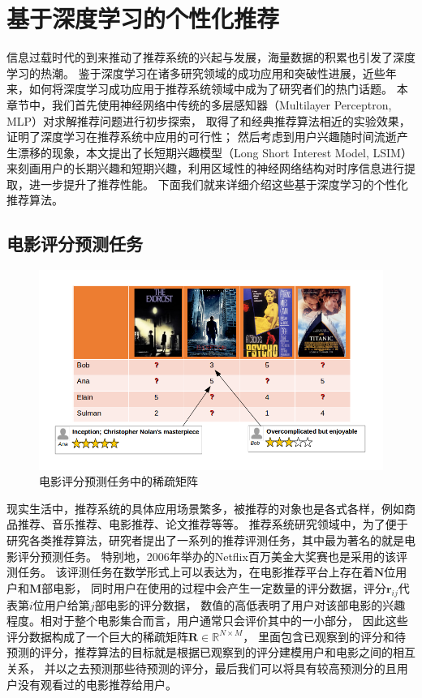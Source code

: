 \chapter{基于深度学习的个性化推荐}
信息过载时代的到来推动了推荐系统的兴起与发展，海量数据的积累也引发了深度学习的热潮。
鉴于深度学习在诸多研究领域的成功应用和突破性进展，近些年来，如何将深度学习成功应用于推荐系统领域中成为了研究者们的热门话题。
本章节中，我们首先使用神经网络中传统的多层感知器（Multilayer Perceptron, MLP）对求解推荐问题进行初步探索，
取得了和经典推荐算法相近的实验效果，证明了深度学习在推荐系统中应用的可行性；
然后考虑到用户兴趣随时间流逝产生漂移的现象，本文提出了长短期兴趣模型（Long Short Interest Model, LSIM）
来刻画用户的长期兴趣和短期兴趣，利用区域性的神经网络结构对时序信息进行提取，进一步提升了推荐性能。
下面我们就来详细介绍这些基于深度学习的个性化推荐算法。

\section{电影评分预测任务}
\begin{figure}[htbp]
\centering
\includegraphics[scale=0.6]{images/task1.png}
\caption{电影评分预测任务中的稀疏矩阵}
\label{fig:task1}
\end{figure}

现实生活中，推荐系统的具体应用场景繁多，被推荐的对象也是各式各样，例如商品推荐、音乐推荐、电影推荐、论文推荐等等。
推荐系统研究领域中，为了便于研究各类推荐算法，研究者提出了一系列的推荐评测任务，其中最为著名的就是电影评分预测任务。
特别地，2006年举办的Netflix百万美金大奖赛也是采用的该评测任务。
该评测任务在数学形式上可以表达为，在电影推荐平台上存在着$\mathbf{N}$位用户和$\mathbf{M}$部电影，
同时用户在使用的过程中会产生一定数量的评分数据，评分$\mathbf{r}_{ij}$代表第$i$位用户给第$j$部电影的评分数据，
数值的高低表明了用户对该部电影的兴趣程度。相对于整个电影集合而言，用户通常只会评价其中的一小部分，
因此这些评分数据构成了一个巨大的稀疏矩阵$\mathbf{R} \in \mathbb{R}^{N \times M}$，
里面包含已观察到的评分和待预测的评分，推荐算法的目标就是根据已观察到的评分建模用户和电影之间的相互关系，
并以之去预测那些待预测的评分，最后我们可以将具有较高预测分的且用户没有观看过的电影推荐给用户。

